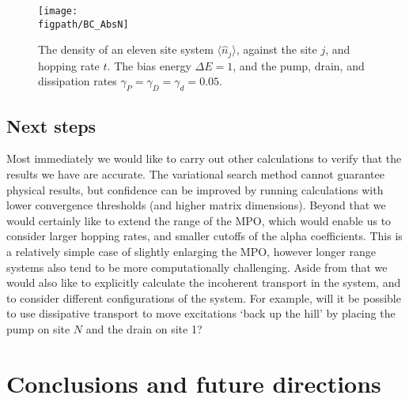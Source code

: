 \begin{figure}[ht!]
	\centering
	\texttt{[image: \\figpath/BC\_AbsN]}
	\caption{\label{fig:fw1-3}The density of an eleven site system \(\langle \hat{n}_{j} \rangle\), against the site \(j\), and hopping rate \(t\). The bias energy \(\Delta E = 1\), and the pump, drain, and dissipation rates \(\gamma_{P} = \gamma_{D} = \gamma_{d} = 0.05\).}
\end{figure}

\subsection{Next steps}
Most immediately we would like to carry out other calculations to verify that the results we have are accurate. The variational search method cannot guarantee physical results, but confidence can be improved by running calculations with lower convergence thresholds (and higher matrix dimensions). Beyond that we would certainly like to extend the range of the MPO, which would enable us to consider larger hopping rates, and smaller cutoffs of the alpha coefficients. This is a relatively simple case of slightly enlarging the MPO, however longer range systems also tend to be more computationally challenging. Aside from that we would also like to explicitly calculate the incoherent transport in the system, and to consider different configurations of the system. For example, will it be possible to use dissipative transport to move excitations `back up the hill' by placing the pump on site \(N\) and the drain on site 1?

\section{Conclusions and future directions} 